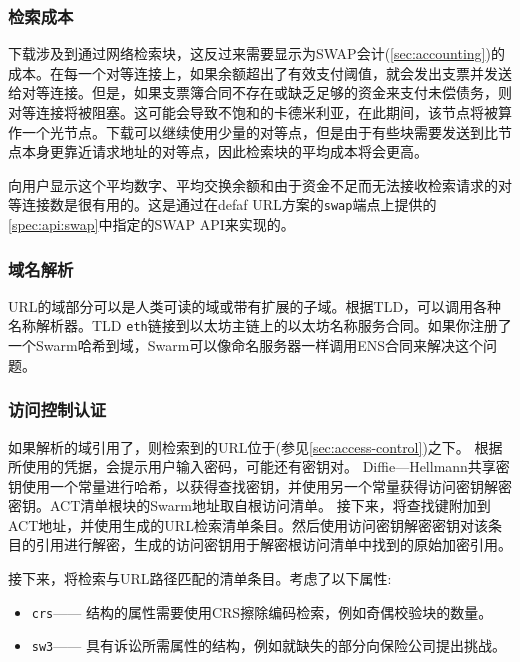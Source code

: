 \subsubsection{检索成本}

下载涉及到通过网络检索块，这反过来需要显示为SWAP会计(\ref{sec:accounting})的成本。在每一个对等连接上，如果余额超出了有效支付阈值，就会发出支票并发送给对等连接。但是，如果支票簿合同不存在或缺乏足够的资金来支付未偿债务，则对等连接将被阻塞。这可能会导致不饱和的卡德米利亚，在此期间，该节点将被算作一个光节点。下载可以继续使用少量的对等点，但是由于有些块需要发送到比节点本身更靠近请求地址的对等点，因此检索块的平均成本将会更高。 

向用户显示这个平均数字、平均交换余额和由于资金不足而无法接收检索请求的对等连接数是很有用的。这是通过在defaf URL方案的\lstinline{swap}端点上提供的\ref{spec:api:swap}中指定的SWAP API来实现的。


\subsubsection{域名解析}

URL的域部分可以是人类可读的域或带有扩展的子域。根据TLD，可以调用各种名称解析器。TLD \lstinline{eth}链接到以太坊主链上的以太坊名称服务合同。如果你注册了一个Swarm哈希到域，Swarm可以像命名服务器一样调用ENS合同来解决这个问题。 

\subsubsection{访问控制认证}

如果解析的域引用了，则检索到的URL位于(参见\ref{sec:access-control})之下。 
根据所使用的凭据，会提示用户输入密码，可能还有密钥对。 
Diffie—Hellmann共享密钥使用一个常量进行哈希，以获得查找密钥，并使用另一个常量获得访问密钥解密密钥。ACT清单根块的Swarm地址取自根访问清单。 
接下来，将查找键附加到ACT地址，并使用生成的URL检索清单条目。然后使用访问密钥解密密钥对该条目的引用进行解密，生成的访问密钥用于解密根访问清单中找到的原始加密引用。

接下来，将检索与URL路径匹配的清单条目。考虑了以下属性:

\begin{itemize}
    \item \lstinline{crs}——{
    结构的属性需要使用CRS擦除编码检索，例如奇偶校验块的数量}。
    \item \lstinline{sw3}——{ 具有诉讼所需属性的结构，例如就缺失的部分向保险公司提出挑战}。 
\end{itemize}


